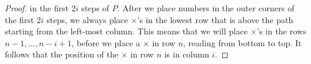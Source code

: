 \documentclass[
final,nomarks
]{dmtcs-episciences}
\begin{document}
\begin{proof}
	in the first \begin{math}2i\end{math} steps of \begin{math}P\end{math}. After we place numbers in the outer corners of 
	the first \begin{math}2i\end{math} steps, we always place \begin{math}\times\end{math}'s  in the lowest row that is above 
	the path starting from the left-most column. This means that we will place 
	\begin{math}\times\end{math}'s in the rows \begin{math}n-1, \ldots, n-i+1\end{math}, 
	before we place a \begin{math}\times\end{math} in row \begin{math}n\end{math}, reading from bottom to top. It follows 
	that the position of the \begin{math}\times\end{math} in row \begin{math}n\end{math} is in column \begin{math}i\end{math}.  
	

\end{proof}
\end{document}
